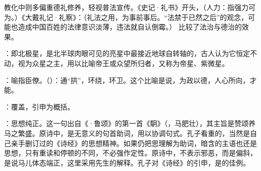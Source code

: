 {{教化中则多偏重德礼修养，轻视普法宣传。《史记·礼书》开头，（人力：指强力可为。）《大戴礼记·礼察》：（礼法之用，为事前事后。“法禁于已然之后”的观念，可能也造成中国百姓的法律意识淡薄，违法就自认倒霉。） 比较了法治与德治的效果。
}

\item {}：即北极星，是北半球肉眼可见的亮星中最接近地球自转轴的，古人认为它恒定不动，视为众星之主，用以比喻帝王或众望所归者，又称为帝星、紫微星。

\item {}：喻指臣僚。（）：通“拱”，环绕，环卫。这个比喻是说，为政以德，人心所向，才能。
}
{}


{
\item {}：覆盖，引申为概括。
\item {}：思想纯正。这一句出自《·鲁颂》的第一首《駉》（，马肥壮），其主旨是赞颂养马之繁盛。原诗中，是无意义的句首助词，用以协调句式。孔子看重的，当然是自己亲手删订过的《诗经》的思想精神。如果仍把思理解为助词，暗含的主语也还是思想，只有重读和停顿的不同，不必强作定性。原诗中，不表示邪恶，而是偏斜，是说马儿体态端正，这里采用先生的解释。孔子对《诗经》的引申，是的佳例。
}
{}


